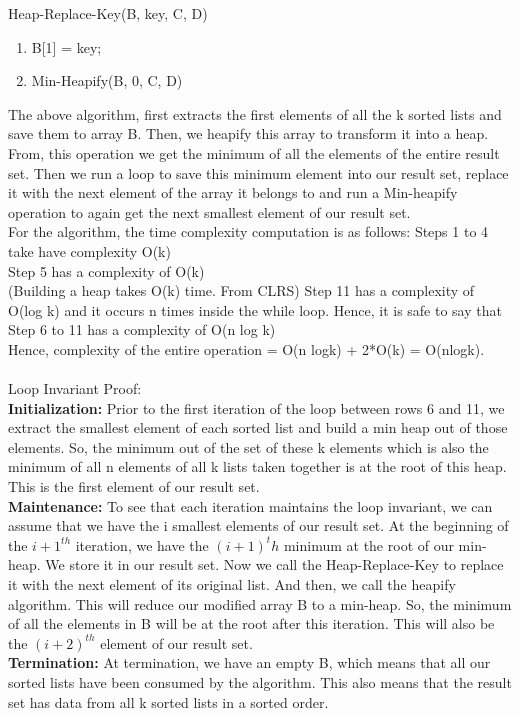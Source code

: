 \documentclass[10pt]{article}
\begin{document}
Heap-Replace-Key(B, key, C, D)
\begin{enumerate}
\item B[1] = key;
\item Min-Heapify(B, 0, C, D)
\end{enumerate}
The above algorithm, first extracts the first elements of all the k sorted lists and save them to array B. Then, we heapify this array to transform it into a heap. From, this operation we get the minimum of all the elements of the entire result set. Then we run a loop to save this minimum element into our result set, replace it with the next element of the array it belongs to and run a Min-heapify operation to again get the next smallest element of our result set.\\
For the algorithm, the time complexity computation is as follows:
Steps 1 to 4 take have complexity O(k)\\
Step 5 has a complexity of O(k)\\ (Building a heap takes O(k) time. From CLRS)
Step 11 has a complexity of O(log k) and it occurs n times inside the while loop. Hence, it is safe to say that Step 6 to 11 has a complexity of O(n log k)\\
Hence, complexity of the entire operation = O(n logk) + 2*O(k) = O(nlogk).\\\\
Loop Invariant Proof:\\
\textbf{Initialization:} Prior to the first iteration of the loop between rows 6 and 11, we extract the smallest element of each sorted list and build a min heap out of those elements. So, the minimum out of the set of these k elements which is also the minimum of all n elements of all k lists taken together is at the root of this heap. This is the first element of our result set.\\
\textbf{Maintenance:} To see that each iteration maintains the loop invariant, we can assume that we have the i smallest elements of our result set. At the beginning of the $i+1^{th}$ iteration, we have the $(i+1)^th$ minimum at the root of our min-heap. We store it in our result set. Now we call the Heap-Replace-Key to replace it with the next element of its original list. And then, we call the heapify algorithm. This will reduce our modified array B to a min-heap. So, the minimum of all the elements in B will be at the root after this iteration. This will also be the $(i+2)^{th}$ element of our result set.\\
\textbf{Termination:} At termination, we have an empty B, which means that all our sorted lists have been consumed by the algorithm. This also means that the result set has data from all k sorted lists in a sorted order.
\newpage
\end{document}
